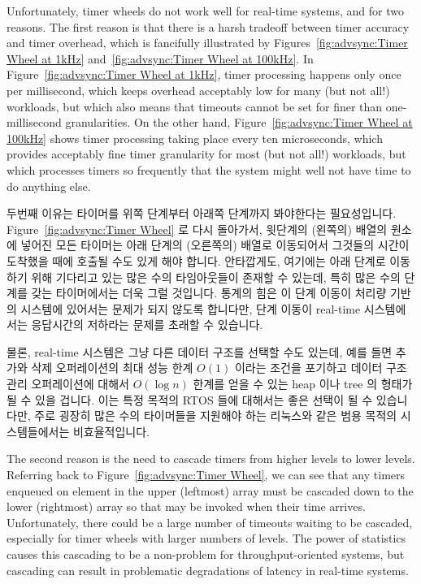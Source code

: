 Unfortunately, timer wheels do not work well for real-time systems, and for
two reasons.
The first reason is that there is a harsh tradeoff between timer
accuracy and timer overhead, which is fancifully illustrated by
Figures~\ref{fig:advsync:Timer Wheel at 1kHz}
and~\ref{fig:advsync:Timer Wheel at 100kHz}.
In
Figure~\ref{fig:advsync:Timer Wheel at 1kHz},
timer processing happens only once per millisecond, which keeps overhead
acceptably low for many (but not all!) workloads, but which also means
that timeouts cannot be set for finer than one-millisecond granularities.
On the other hand,
Figure~\ref{fig:advsync:Timer Wheel at 100kHz}
shows timer processing taking place every ten microseconds, which
provides acceptably fine timer granularity for most (but not all!)
workloads, but which processes timers so frequently that the system
might well not have time to do anything else.
\fi

두번째 이유는 타이머를 위쪽 단계부터 아래쪽 단계까지 봐야한다는 필요성입니다.
Figure~\ref{fig:advsync:Timer Wheel} 로 다시 돌아가서, 윗단계의 (왼쪽의) 배열의
 원소에 넣어진 모든 타이머는 아래 단계의 (오른쪽의) 배열로 이동되어서
그것들의 시간이 도착했을 때에 호출될 수도 있게 해야 합니다.
안타깝게도, 여기에는 아래 단계로 이동하기 위해 기다리고 있는 많은 수의
타임아웃들이 존재할 수 있는데, 특히 많은 수의 단계를 갖는 타이머에서는 더욱
그럴 것입니다.
통계의 힘은 이 단계 이동이 처리량 기반의 시스템에 있어서는 문제가 되지 않도록
합니다만, 단계 이동이 real-time 시스템에서는 응답시간의 저하라는 문제를 초래할
수 있습니다.

물론, real-time 시스템은 그냥 다른 데이터 구조를 선택할 수도 있는데, 예를 들면
추가와 삭제 오퍼레이션의 최대 성능 한계 $O(1)$ 이라는 조건을 포기하고 데이터
구조 관리 오퍼레이션에 대해서 $O(\log n)$ 한계를 얻을 수 있는 heap 이나 tree 의
형태가 될 수 있을 겁니다.
이는 특정 목적의 RTOS 들에 대해서는 좋은 선택이 될 수 있습니다만, 주로 굉장히
많은 수의 타이머들을 지원해야 하는 리눅스와 같은 범용 목적의 시스템들에서는
비효율적입니다.
\iffalse

The second reason is the need to cascade timers from higher levels to
lower levels.
Referring back to
Figure~\ref{fig:advsync:Timer Wheel},
we can see that any timers enqueued on element  in the upper
(leftmost) array must be cascaded down to the lower (rightmost)
array so that may be invoked when their time arrives.
Unfortunately, there could be a large number of timeouts
waiting to be cascaded, especially for timer wheels with larger numbers
of levels.
The power of statistics causes this cascading to be a non-problem for
throughput-oriented systems, but cascading can result in problematic
degradations of latency in real-time systems.


